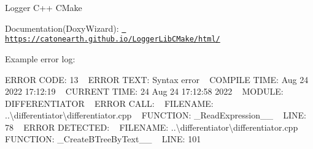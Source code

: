 Logger C++ CMake 

Documentation(\+Doxy\+Wizard)\+: \href{https://catonearth.github.io/LoggerLibCMake/html/}{\texttt{ https\+://catonearth.\+github.\+io/\+Logger\+Lib\+CMake/html/}}

Example error log\+: ~\newline


ERROR CODE\+: 13 ~\newline
 ERROR TEXT\+: Syntax error ~\newline
 \quad{} COMPILE TIME\+: Aug 24 2022 17\+:12\+:19 ~\newline
 \quad{} CURRENT TIME\+: 24 Aug 24 17\+:12\+:58 2022 ~\newline
 \quad{} MODULE\+: DIFFERENTIATOR ~\newline
 \quad{}\quad{}ERROR CALL\+: ~\newline
 \quad{}\quad{}\quad{}FILENAME\+: ..\textbackslash{}differentiator\textbackslash{}differentiator.cpp ~\newline
 \quad{}\quad{}\quad{}FUNCTION\+: \+\_\+\+Read\+Expression\+\_\+\+\_\+ ~\newline
 \quad{}\quad{}\quad{}LINE\+: 78 ~\newline
 \quad{}\quad{}ERROR DETECTED\+: ~\newline
 \quad{}\quad{}\quad{}FILENAME\+: ..\textbackslash{}differentiator\textbackslash{}differentiator.cpp ~\newline
 \quad{}\quad{}\quad{}FUNCTION\+: \+\_\+\+Create\+BTree\+By\+Text\+\_\+\+\_\+ ~\newline
 \quad{}\quad{}\quad{}LINE\+: 101 ~\newline
 